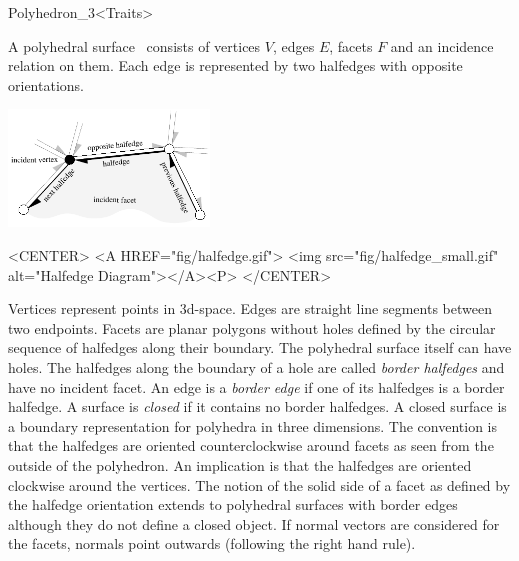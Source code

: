
\ccRefPageBegin



\begin{ccRefClass}{Polyhedron_3<Traits>}

\ccDefinition
  
A polyhedral surface \ccClassTemplateName\ consists of vertices $V$,
edges $E$, facets $F$ and an incidence relation on them.  Each edge is
represented by two halfedges with opposite orientations.

\begin{ccTexOnly}
    \vspace{-7mm}
    \begin{center}
      \parbox{0.4\textwidth}{%
        \includegraphics[width=0.4\textwidth]{Polyhedron_ref/fig/halfedge}%
      }
    \end{center}
    \vspace{-5mm}
\end{ccTexOnly}

\begin{ccHtmlOnly}
    <CENTER>
    <A HREF="fig/halfedge.gif">
        <img src="fig/halfedge_small.gif" alt="Halfedge Diagram"></A><P>
    </CENTER>
\end{ccHtmlOnly}

Vertices represent points in 3d-space. Edges are straight line segments
between two endpoints. Facets are planar polygons without holes
defined by the circular sequence of halfedges along their boundary.
The polyhedral surface itself can have holes. The halfedges
along the boundary of a hole are called {\em border halfedges\/} and
have no incident facet. An edge is a {\em border edge\/} if one of
its halfedges is a border halfedge.  A surface is {\em closed\/} if it
contains no border halfedges. A closed surface is a boundary
representation for polyhedra in three dimensions. The convention is
that the halfedges are oriented counterclockwise around facets as seen
from the outside of the polyhedron. An implication is that the
halfedges are oriented clockwise around the vertices. The notion of
the solid side of a facet as defined by the halfedge orientation
extends to polyhedral surfaces with border edges although they do not
define a closed object. If normal vectors are considered for the
facets, normals point outwards (following the right hand rule).


\end{ccRefClass}
